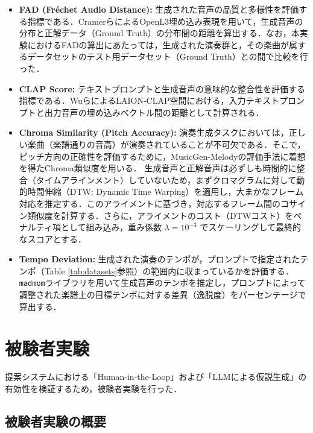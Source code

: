 \begin{itemize}
    \item \textbf{FAD (Fréchet Audio Distance):}
    生成された音声の品質と多様性を評価する指標である．Cramerら\cite{FAD}によるOpenL3埋め込み表現を用いて，生成音声の分布と正解データ（Ground Truth）の分布間の距離を算出する．なお，本実験におけるFADの算出にあたっては，生成された演奏群と，その楽曲が属するデータセットのテスト用データセット（Ground Truth）との間で比較を行った．
    
    \item \textbf{CLAP Score:}
    テキストプロンプトと生成音声の意味的な整合性を評価する指標である．Wuら\cite{clap}によるLAION-CLAP空間における，入力テキストプロンプトと出力音声の埋め込みベクトル間の距離として計算される．
    
    \item \textbf{Chroma Similarity (Pitch Accuracy):}
    演奏生成タスクにおいては，正しい楽曲（楽譜通りの音高）が演奏されていることが不可欠である．そこで，ピッチ方向の正確性を評価するために，MusicGen-Melody\cite{copet2023}の評価手法に着想を得たChroma類似度を用いる．
    生成音声と正解音声は必ずしも時間的に整合（タイムアラインメント）していないため，まずクロマグラムに対して動的時間伸縮（DTW: Dynamic Time Warping）を適用し，大まかなフレーム対応を推定する．このアライメントに基づき，対応するフレーム間のコサイン類似度を計算する．さらに，アライメントのコスト（DTWコスト）をペナルティ項として組み込み，重み係数 $\lambda = 10^{-3}$ でスケーリングして最終的なスコアとする．
    
    \item \textbf{Tempo Deviation:}
    生成された演奏のテンポが，プロンプトで指定されたテンポ（Table \ref{tab:datasets}参照）の範囲内に収まっているかを評価する．
    \texttt{madmom}ライブラリを用いて生成音声のテンポを推定し，プロンプトによって調整された楽譜上の目標テンポに対する差異（逸脱度）をパーセンテージで算出する．
\end{itemize}

\section{被験者実験}
\label{sec:被験者実験}

提案システムにおける「Human-in-the-Loop」および「LLMによる仮説生成」の有効性を検証するため，被験者実験を行った．

\subsection{被験者実験の概要}
\label{subsec:被験者実験の概要}

